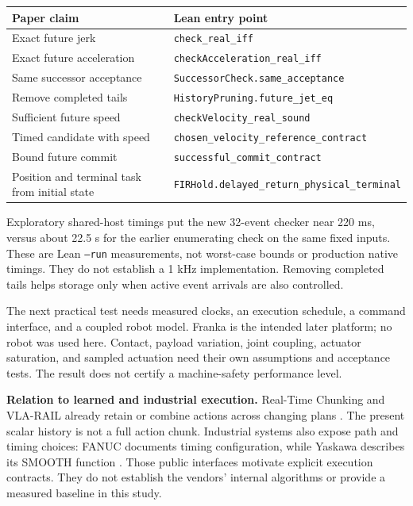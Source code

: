 \documentclass[10pt,letterpaper]{article}
\begin{document}
\begin{center}\small
\begin{tabular}{p{.36\linewidth}p{.56\linewidth}}
\toprule
Paper claim & Lean entry point\\
\midrule
Exact future jerk & \texttt{check\_real\_iff}\\
Exact future acceleration & \texttt{checkAcceleration\_real\_iff}\\
Same successor acceptance & \texttt{SuccessorCheck.same\_acceptance}\\
Remove completed tails & \texttt{HistoryPruning.future\_jet\_eq}\\
Sufficient future speed & \texttt{checkVelocity\_real\_sound}\\
Timed candidate with speed & \texttt{chosen\_velocity\_reference\_contract}\\
Bound future commit & \texttt{successful\_commit\_contract}\\
Position and terminal task from initial state & \texttt{FIRHold.delayed\_return\_physical\_terminal}\\
\bottomrule
\end{tabular}
\end{center}

Exploratory shared-host timings put the new 32-event checker near 220 ms,
versus about 22.5 s for the earlier enumerating check on the same fixed inputs.
These are Lean \texttt{--run} measurements, not worst-case bounds or production
native timings. They do not establish a 1 kHz implementation. Removing completed
tails helps storage only when active event arrivals are also controlled.

The next practical test needs measured clocks, an execution schedule, a command
interface, and a coupled robot model. Franka is the intended later platform;
no robot was used here. Contact, payload variation, joint coupling, actuator
saturation, and sampled actuation need their own assumptions and acceptance
tests. The result does not certify a machine-safety performance level.

\textbf{Relation to learned and industrial execution.}
Real-Time Chunking and VLA-RAIL already retain or combine actions across changing
plans \cite{rtc,rail}. The present scalar history is not a full action chunk.
Industrial systems also expose path and timing choices: FANUC documents timing
configuration, while Yaskawa describes its SMOOTH function \cite{fanuc,yaskawa}. Those public interfaces
motivate explicit execution contracts. They do not establish the vendors'
internal algorithms or provide a measured baseline in this study.
\end{document}
